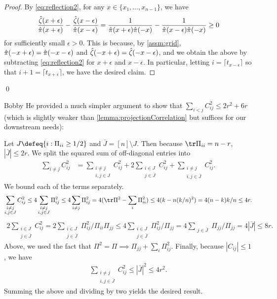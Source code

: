 \documentclass[main.tex]{subfiles}
\begin{document}
\begin{proof}
By \cref{eq:reflection2}, for any $x\in\{x_{1},\ldots,x_{n-1}\}$, we have
\[
\frac{\hat{\zeta}(x+\epsilon)}{\hat{\pi}(x+\epsilon)}-\frac{\hat{\zeta}(x-\epsilon)}{\hat{\pi}(x-\epsilon)}=\frac{1}{\hat{\pi}(x+\epsilon)\hat{\pi}(-x)}-\frac{1}{\hat{\pi}(x-\epsilon)\hat{\pi}(-x)}\ge0
\]
for sufficiently small $\epsilon>0$. This is because, by \cref{assm:grid}, $\hat{\pi}(-x+\epsilon)=\hat{\pi}(-x-\epsilon)$ and $\hat{\zeta}(-x+\epsilon)=\hat{\zeta}(-x-\epsilon)$, and we obtain the above by subtracting \cref{eq:reflection2} for $x+\epsilon$ and $x-\epsilon$. In particular, letting $i=\lceil t_{x-\epsilon}\rceil$ so that $i+1=\lceil t_{x+\epsilon}\rceil$, we have the desired claim.
\end{proof}

\qed

\begin{rem}\label{lemma:projectionCorrelation}
Bobby He provided a much simpler argument to show that $\sum_{i < j} C_{ij}^2 \le 2 r^2 + 6r$ (which is slightly weaker than \cref{lemma:projectionCorrelation} but suffices for our downstream needs):

Let $J \defeq \{i: \Pi_{ii} \ge 1/2\}$ and $\bar J = [n] \setminus J$.
Then because $\tr \Pi_{ii} = n - r$, $|\bar J| \le 2 r$.
We split the squared sum of off-diagonal entries into
\begin{align*}
  \sum_{i\ne j} C_{ij}^2
  &=
    \sum_{\substack{i\ne j\\ i,j \in J}} C_{ij}^2
    + 2\sum_{\substack{i \in J \\ j \in \bar J}} C_{ij}^2
    + \sum_{\substack{i\ne j\\ i, j \in \bar J}} C_{ij}^2
    .
\end{align*}
We bound each of the terms separately.
\begin{align*}
  \sum_{\substack{i\ne j\\ i,j \in J}} C_{ij}^2
  \le 4 \sum_{\substack{i\ne j\\ i,j \in J}} \Pi_{ij}^2
  \le 4 \sum_{\substack{i\ne j}} \Pi_{ij}^2
  = 4 (\tr \Pi ^ 2 - \sum_{i} \Pi_{ii}^2)
  \le 4 (k - n (k/n)^2)
  = 4(n - k)k/n \le 4r.
\end{align*}
\begin{align*}
  2\sum_{\substack{i \in J \\ j \in \bar J}} C_{ij}^2
  = 2\sum_{\substack{i \in J \\ j \in \bar J}} \Pi_{ij}^2/\Pi_{ii} \Pi_{jj}
  \le 4\sum_{\substack{i \in J \\ j \in \bar J}} \Pi_{ij}^2/  \Pi_{jj}
  = 4\sum_{\substack{j \in \bar J}} \Pi_{jj}/  \Pi_{jj}
  = 4 |\bar J|
  \le 8 r.
\end{align*}
Above, we used the fact that $\Pi^2 = \Pi \implies \Pi_{jj} + \sum_{i} \Pi_{ij}^2$.
Finally, because $|C_{ij}| \le 1$, we have
\begin{align*}
  \sum_{\substack{i\ne j\\ i, j \in \bar J}} C_{ij}^2
  \le |\bar J|^2 \le 4r^2.
\end{align*}
Summing the above and dividing by two yields the desired result.
\end{rem}
\end{document}
